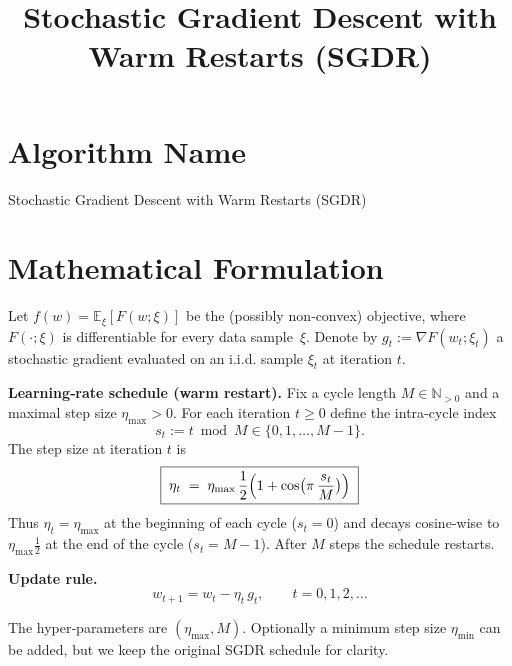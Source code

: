 \documentclass{article}
\begin{document}
\title{Stochastic Gradient Descent with Warm Restarts (SGDR)}
\author{}
\date{}
\maketitle

\tableofcontents
\newpage

\section*{Algorithm Name}
Stochastic Gradient Descent with Warm Restarts (SGDR)

\section*{Mathematical Formulation}
Let $f(w)=\mathbb{E}_{\xi}[F(w;\xi)]$ be the (possibly non‑convex) objective, where $F(\cdot;\xi)$ is differentiable for every data sample~$\xi$.  
Denote by $g_t:=\nabla F(w_t;\xi_t)$ a stochastic gradient evaluated on an i.i.d. sample $\xi_t$ at iteration $t$.

\bigskip
\noindent\textbf{Learning‑rate schedule (warm restart).}  
Fix a cycle length $M\in\mathbb{N}_{>0}$ and a maximal step size $\eta_{\max}>0$.  
For each iteration $t\ge 0$ define the intra‑cycle index 
\[
s_t:= t \bmod M \in\{0,1,\dots ,M-1\}.
\]
The step size at iteration $t$ is
\begin{equation}
\boxed{\;
\eta_t \;=\; \eta_{\max}\,\frac{1}{2}\Bigl(1+\cos\bigl(\pi\,\frac{s_t}{M}\bigr)\Bigr)
\;}\label{eq:sgdr-schedule}
\end{equation}
Thus $\eta_t=\eta_{\max}$ at the beginning of each cycle ($s_t=0$) and decays cosine‑wise to $\eta_{\max}\frac{1}{2}$ at the end of the cycle ($s_t=M-1$). After $M$ steps the schedule restarts.

\bigskip
\noindent\textbf{Update rule.}
\begin{equation}
\boxed{\;
w_{t+1}=w_t-\eta_t\,g_t,\qquad t=0,1,2,\dots
\;}\label{eq:update}
\end{equation}

The hyper‑parameters are $(\eta_{\max},M)$. Optionally a minimum step size $\eta_{\min}$ can be added, but we keep the original SGDR schedule for clarity.

\end{document}
